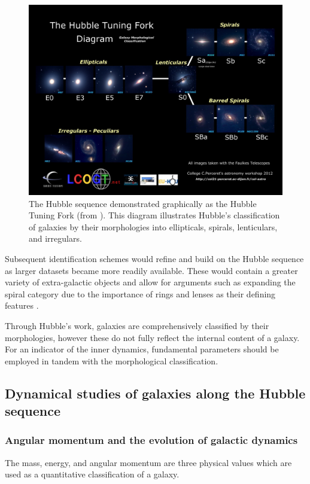 \documentclass[12pt, twocolumn, nofootinbib]{revtex4-1}    %
\begin{document}
\begin{figure}
\includegraphics[width=\textwidth]{introduction/hubble-tuning-fork-diagram}
\caption{The Hubble sequence demonstrated graphically as the Hubble Tuning Fork (from \citealt{hubble_tuning_fork}). This diagram illustrates Hubble's classification of galaxies by their morphologies into ellipticals, spirals, lenticulars, and irregulars.}
\label{fig:hubble_tuning_fork}
\end{figure}

Subsequent identification schemes would refine and build on the Hubble sequence as larger datasets became more readily available. These would contain a greater variety of extra-galactic objects and allow for arguments such as expanding the spiral category due to the importance of rings and lenses as their defining features \citep{1959HDP....53..275D}. 

Through Hubble's work, galaxies are comprehensively classified by their morphologies, however these do not fully reflect the internal content of a galaxy. For an indicator of the inner dynamics, fundamental parameters should be employed in tandem with the morphological classification. 

\vspace{2ex} %
\subsection{Dynamical studies of galaxies along the Hubble sequence}
\subsubsection{Angular momentum and the evolution of galactic dynamics}
\noindent
The mass, energy, and angular momentum are three physical values which are used as a quantitative classification of a galaxy. 
\end{document}
